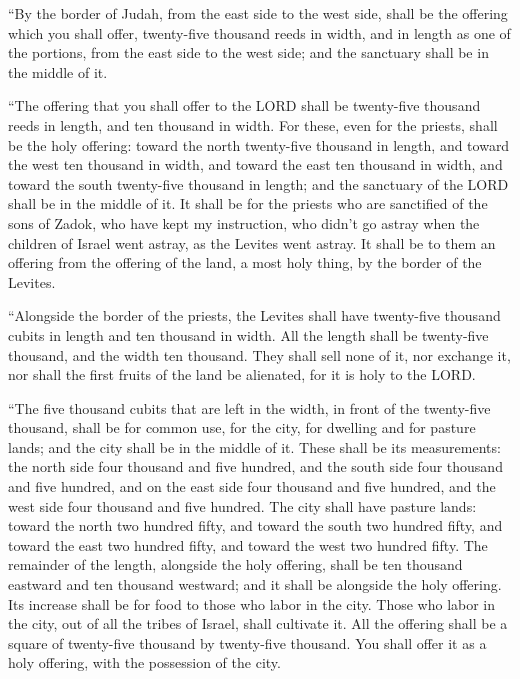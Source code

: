 \myverse{}“By the border of Judah, from the east side to the west side,
shall be the offering which you shall offer, twenty-five thousand reeds in width, and in length as one
of the portions, from the east side to the west side; and the sanctuary shall be in the middle of it.

\myverse{}“The offering that you shall offer to the LORD shall be twenty-five
thousand reeds in length, and ten thousand in width.
\myverse{}For these, even for the priests, shall be the holy offering: toward the north
twenty-five thousand in length, and toward the west ten thousand in width, and toward the east ten thousand
in width, and toward the south twenty-five thousand in length; and the sanctuary of the LORD shall be
in the middle of it.
\myverse{}It shall be for the priests who are sanctified of the sons of Zadok, who
have kept my instruction, who didn’t go astray when the children of Israel went astray, as the Levites
went astray.
\myverse{}It shall be to them an offering from the offering of the land, a most holy
thing, by the border of the Levites.

\myverse{}“Alongside the border of the priests, the Levites shall have
twenty-five thousand cubits in length and ten thousand in width. All the length shall be twenty-five thousand,
and the width ten thousand.
\myverse{}They shall sell none of it, nor exchange it, nor shall the first fruits of
the land be alienated, for it is holy to the LORD.

\myverse{}“The five thousand cubits that are left in the width, in front
of the twenty-five thousand, shall be for common use, for the city, for dwelling and for pasture lands;
and the city shall be in the middle of it.
\myverse{}These shall be its measurements: the north side four thousand and five hundred,
and the south side four thousand and five hundred, and on the east side four thousand and five hundred,
and the west side four thousand and five hundred.
\myverse{}The city shall have pasture lands: toward the north two hundred fifty, and
toward the south two hundred fifty, and toward the east two hundred fifty, and toward the west two hundred
fifty.
\myverse{}The remainder of the length, alongside the holy offering, shall be ten thousand
eastward and ten thousand westward; and it shall be alongside the holy offering. Its increase shall be
for food to those who labor in the city.
\myverse{}Those who labor in the city, out of all the tribes of Israel, shall cultivate
it.
\myverse{}All the offering shall be a square of twenty-five thousand by twenty-five
thousand. You shall offer it as a holy offering, with the possession of the city.

